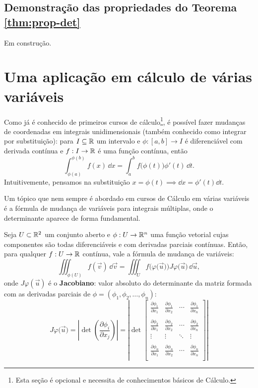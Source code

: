 \documentclass[../livro.tex]{subfiles}  %
\begin{document}
\subsection{Demonstração das propriedades do Teorema \ref*{thm:prop-det}}

Em construção.

\section{Uma aplicação em cálculo de várias variáveis}

Como já é conhecido de primeiros cursos de cálculo\footnote{Esta seção é opcional e necessita de conhecimentos básicos de Cálculo.}, é possível fazer mudanças de coordenadas em integrais unidimensionais (também conhecido como integrar por substituição): para $I \subseteq \mathbb{R}$ um intervalo e $\phi : [a,b] \to I$ é diferenciável com derivada contínua e $f: I \to \mathbb{R}$ é uma função contínua, então
\begin{equation}
\int_{\phi (a)}^{\phi (b)} f(x) \, \dd x = \int_{a}^{b} f \big(\phi (t)\big) \phi'(t) \, \dd t.
\end{equation} Intuitivemente, pensamos na substituição $x = \phi (t) \implies \dd x = \phi' (t)\dd t$.

Um tópico que nem sempre é abordado em cursos de Cálculo em várias variáveis é a fórmula de mudança de variáveis para integrais múltiplas, onde o determinante aparece de forma fundamental.

\begin{theorem}
Seja $U \subset \mathbb{R}^2$ um conjunto aberto e $\phi: U \to \mathbb{R}^n$ uma função vetorial cujas componentes são todas diferenciáveis e com derivadas parciais contínuas. Então, para qualquer $f: U \to \mathbb{R}$ contínua, vale a fórmula de mudança de variáveis:
\begin{equation}
\iiint_{\phi (U)}  f(\vec{v}) \, \dd \vec{v} =  \iiint _{U} f\big(\varphi \big(\vec{u}\big)\big) J\varphi \big(\vec{u}\big) \, \dd\vec{u},
\end{equation} onde $J\varphi (\vec{u})$ é o \textbf{Jacobiano}: valor absoluto do determinante da matriz formada com as derivadas parciais de $\phi = (\phi_1, \phi_2, \dots, \phi_n)$:
\begin{equation}
J\varphi \big(\vec{u}\big) = \left|
\det \left( \frac{\partial \phi_i}{\partial x_j} \right) 
\right| = \left|
\det 
\begin{bmatrix}
\frac{\partial \phi_1}{\partial x_1} & \frac{\partial \phi_1}{\partial x_2} & \cdots & \frac{\partial \phi_1}{\partial x_n} \\
 &&& \\
\frac{\partial \phi_2}{\partial x_1} & \frac{\partial \phi_2}{\partial x_2} & \cdots & \frac{\partial \phi_2}{\partial x_n} \\
\vdots & \vdots & \ddots & \vdots \\
 &&& \\
\frac{\partial \phi_n}{\partial x_1} & \frac{\partial \phi_n}{\partial x_2} & \cdots & \frac{\partial \phi_n}{\partial x_n} \\
\end{bmatrix}
\right| 
\end{equation}
\end{theorem}
\end{document}
